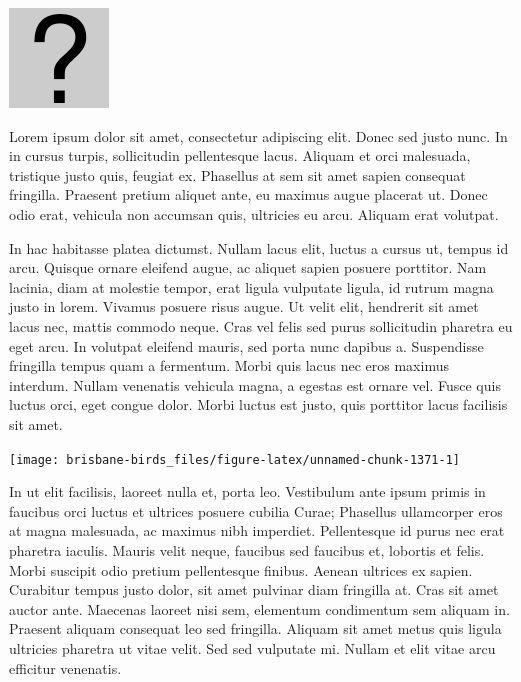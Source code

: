 \documentclass[]{book}
\let\origfigure\figure
\let\endorigfigure\endfigure
\renewenvironment{figure}[1][2] {
  \expandafter\origfigure\expandafter[H]
} {
  \endorigfigure
}
\begin{document}
\begin{figure}
\centering
\includegraphics{assets/missing.png}
\caption{No image for species}
\end{figure}

Lorem ipsum dolor sit amet, consectetur adipiscing elit. Donec sed justo
nunc. In in cursus turpis, sollicitudin pellentesque lacus. Aliquam et
orci malesuada, tristique justo quis, feugiat ex. Phasellus at sem sit
amet sapien consequat fringilla. Praesent pretium aliquet ante, eu
maximus augue placerat ut. Donec odio erat, vehicula non accumsan quis,
ultricies eu arcu. Aliquam erat volutpat.

In hac habitasse platea dictumst. Nullam lacus elit, luctus a cursus ut,
tempus id arcu. Quisque ornare eleifend augue, ac aliquet sapien posuere
porttitor. Nam lacinia, diam at molestie tempor, erat ligula vulputate
ligula, id rutrum magna justo in lorem. Vivamus posuere risus augue. Ut
velit elit, hendrerit sit amet lacus nec, mattis commodo neque. Cras vel
felis sed purus sollicitudin pharetra eu eget arcu. In volutpat eleifend
mauris, sed porta nunc dapibus a. Suspendisse fringilla tempus quam a
fermentum. Morbi quis lacus nec eros maximus interdum. Nullam venenatis
vehicula magna, a egestas est ornare vel. Fusce quis luctus orci, eget
congue dolor. Morbi luctus est justo, quis porttitor lacus facilisis sit
amet.

\begin{figure}
\texttt{[image: brisbane-birds\_files/figure-latex/unnamed-chunk-1371-1]} \caption{insert figure caption}\label{fig:unnamed-chunk-1371}
\end{figure}

In ut elit facilisis, laoreet nulla et, porta leo. Vestibulum ante ipsum
primis in faucibus orci luctus et ultrices posuere cubilia Curae;
Phasellus ullamcorper eros at magna malesuada, ac maximus nibh
imperdiet. Pellentesque id purus nec erat pharetra iaculis. Mauris velit
neque, faucibus sed faucibus et, lobortis et felis. Morbi suscipit odio
pretium pellentesque finibus. Aenean ultrices ex sapien. Curabitur
tempus justo dolor, sit amet pulvinar diam fringilla at. Cras sit amet
auctor ante. Maecenas laoreet nisi sem, elementum condimentum sem
aliquam in. Praesent aliquam consequat leo sed fringilla. Aliquam sit
amet metus quis ligula ultricies pharetra ut vitae velit. Sed sed
vulputate mi. Nullam et elit vitae arcu efficitur venenatis.
\end{document}
